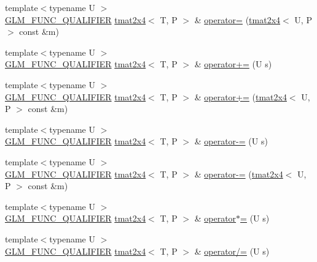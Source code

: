 \begin{DoxyCompactItemize}
\item 
{\footnotesize template$<$typename U $>$ }\\\hyperlink{setup_8hpp_a33fdea6f91c5f834105f7415e2a64407}{G\+L\+M\+\_\+\+F\+U\+N\+C\+\_\+\+Q\+U\+A\+L\+I\+F\+I\+ER} \hyperlink{structglm_1_1detail_1_1tmat2x4}{tmat2x4}$<$ T, P $>$ \& \hyperlink{structglm_1_1detail_1_1tmat2x4_a05368bd4ad581b0e7d000b051f71bae5}{operator=} (\hyperlink{structglm_1_1detail_1_1tmat2x4}{tmat2x4}$<$ U, P $>$ const \&m)
\item 
{\footnotesize template$<$typename U $>$ }\\\hyperlink{setup_8hpp_a33fdea6f91c5f834105f7415e2a64407}{G\+L\+M\+\_\+\+F\+U\+N\+C\+\_\+\+Q\+U\+A\+L\+I\+F\+I\+ER} \hyperlink{structglm_1_1detail_1_1tmat2x4}{tmat2x4}$<$ T, P $>$ \& \hyperlink{structglm_1_1detail_1_1tmat2x4_a4580596394e88effd02a0ea4f0b1f3a4}{operator+=} (U s)
\item 
{\footnotesize template$<$typename U $>$ }\\\hyperlink{setup_8hpp_a33fdea6f91c5f834105f7415e2a64407}{G\+L\+M\+\_\+\+F\+U\+N\+C\+\_\+\+Q\+U\+A\+L\+I\+F\+I\+ER} \hyperlink{structglm_1_1detail_1_1tmat2x4}{tmat2x4}$<$ T, P $>$ \& \hyperlink{structglm_1_1detail_1_1tmat2x4_af83887f4894721e8b28d9253fb616700}{operator+=} (\hyperlink{structglm_1_1detail_1_1tmat2x4}{tmat2x4}$<$ U, P $>$ const \&m)
\item 
{\footnotesize template$<$typename U $>$ }\\\hyperlink{setup_8hpp_a33fdea6f91c5f834105f7415e2a64407}{G\+L\+M\+\_\+\+F\+U\+N\+C\+\_\+\+Q\+U\+A\+L\+I\+F\+I\+ER} \hyperlink{structglm_1_1detail_1_1tmat2x4}{tmat2x4}$<$ T, P $>$ \& \hyperlink{structglm_1_1detail_1_1tmat2x4_a0289438555ea967c110a13f4df846953}{operator-\/=} (U s)
\item 
{\footnotesize template$<$typename U $>$ }\\\hyperlink{setup_8hpp_a33fdea6f91c5f834105f7415e2a64407}{G\+L\+M\+\_\+\+F\+U\+N\+C\+\_\+\+Q\+U\+A\+L\+I\+F\+I\+ER} \hyperlink{structglm_1_1detail_1_1tmat2x4}{tmat2x4}$<$ T, P $>$ \& \hyperlink{structglm_1_1detail_1_1tmat2x4_a7f1203e2377c0b0f9e5c1a1bb68006a7}{operator-\/=} (\hyperlink{structglm_1_1detail_1_1tmat2x4}{tmat2x4}$<$ U, P $>$ const \&m)
\item 
{\footnotesize template$<$typename U $>$ }\\\hyperlink{setup_8hpp_a33fdea6f91c5f834105f7415e2a64407}{G\+L\+M\+\_\+\+F\+U\+N\+C\+\_\+\+Q\+U\+A\+L\+I\+F\+I\+ER} \hyperlink{structglm_1_1detail_1_1tmat2x4}{tmat2x4}$<$ T, P $>$ \& \hyperlink{structglm_1_1detail_1_1tmat2x4_a3d1fb988d316f24267ca8349b5627be8}{operator$\ast$=} (U s)
\item 
{\footnotesize template$<$typename U $>$ }\\\hyperlink{setup_8hpp_a33fdea6f91c5f834105f7415e2a64407}{G\+L\+M\+\_\+\+F\+U\+N\+C\+\_\+\+Q\+U\+A\+L\+I\+F\+I\+ER} \hyperlink{structglm_1_1detail_1_1tmat2x4}{tmat2x4}$<$ T, P $>$ \& \hyperlink{structglm_1_1detail_1_1tmat2x4_a84f40f6dabc1767c21dd5440f038a363}{operator/=} (U s)
\end{DoxyCompactItemize}


